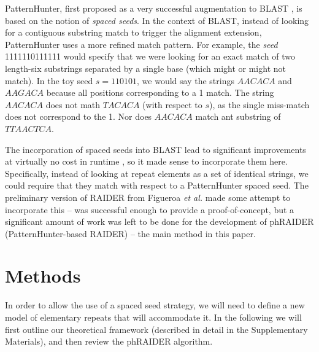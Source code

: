 \documentclass{bmcart}
\begin{document}
PatternHunter, first proposed as a very successful augmentation to
BLAST \cite{Altschul:1997p843,Li:2004wl}, is based on the notion of {\it
  spaced seeds}.  In the context of BLAST, instead of looking for a
contiguous substring match to trigger the alignment extension,
PatternHunter uses a more refined match pattern.  For example, the
{\it seed} 1111110111111 would specify that we were looking for an exact
match of two length-six substrings separated by a single base (which
might or might not match).  In the toy seed $s=110101$, we would say the
strings $AACACA$ and $AAGACA$ because all positions corresponding to a
1 match.  The string $AACACA$ does not math $TACACA$ (with respect to
$s$), as the single miss-match does not correspond to the 1.  Nor does
$AACACA$ match ant substring of $TTAACTCA$.

The incorporation of spaced seeds into BLAST lead to significant
improvements at virtually no cost in runtime \cite{Li:2004wl}, so it made sense to
incorporate them here.  Specifically, instead of looking at repeat
elements as a set of identical strings, we could require that they
match with respect to a PatternHunter spaced seed.  The preliminary
version of RAIDER from Figueroa {\it et al.} made some attempt to
incorporate this -- was successful enough to provide a
proof-of-concept, but a significant amount of work was left to be done
for the development of phRAIDER (PatternHunter-based RAIDER) -- the
main method in this paper.

\section*{Methods}

In order to allow the use of a spaced seed strategy, we will need to
define a new model of elementary repeats that will accommodate it.  In
the following we will first outline our theoretical framework
(described in detail in the Supplementary Materials), and then review
the phRAIDER algorithm.
\end{document}
